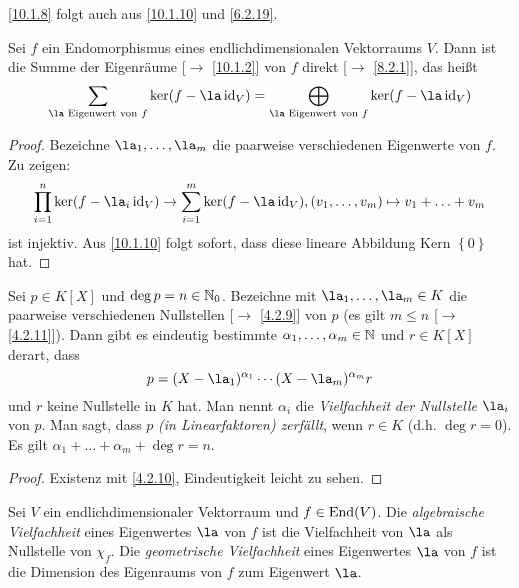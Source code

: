 \documentclass[../../main.tex]{subfiles}
\begin{document}
\begin{bem}\label{10.1.11}
\ref{10.1.8} folgt auch aus \ref{10.1.10} und \ref{6.2.19}.
\end{bem}

\begin{kor}\label{10.1.12}
Sei $f$ ein Endomorphismus eines endlichdimensionalen Vektorraums $V$. Dann ist die Summe der Eigenräume {\rm[$\to$ \ref{10.1.2}]} von $f$ direkt {\rm[$\to$ \ref{8.2.1}]}, das heißt
$$\sum_{\la\text{ Eigenwert von } f}\ker(f-\la\id_V) = \bigoplus_{\la\text{ Eigenwert von } f}\ker(f-\la\id_V)$$
\end{kor}
\begin{proof}
Bezeichne $\la_1,\ldots,\la_m$ die paarweise verschiedenen Eigenwerte von $f$. Zu zeigen:
$$\prod_{i = 1}^{n}\ker(f-\la_i\id_V)\to \sum_{i = 1}^{m}\ker(f-\la\id_V), (v_1,\ldots,v_m)\mapsto v_1+\ldots+v_m$$
ist injektiv. Aus \ref{10.1.10} folgt sofort, dass diese lineare Abbildung Kern $\left\{0\right\}$ hat.
\end{proof}

\begin{propdef}\label{10.1.13}
Sei $p\in K[X]$ und $\deg p = n\in \mathbb N_0$. Bezeichne mit $\la_1,\ldots,\la_m\in K$ die paarweise verschiedenen Nullstellen [$\to$ \ref{4.2.9}] von $p$ (es gilt $m\le n$ [$\to$ \ref{4.2.11}]). Dann gibt es eindeutig bestimmte $\alpha_1,\ldots,\alpha_m\in \mathbb N$ und $r\in K[X]$ derart, dass \[p = (X-\la_1)^{\alpha_1}\dotsm (X-\la_m)^{\alpha_m}r\]
und $r$ keine Nullstelle in $K$ hat. Man nennt $\alpha_i$ die \emph{Vielfachheit} \emph{der Nullstelle} $\la_i$ von $p$. Man sagt, dass $p$ \emph{(in Linearfaktoren) zerfällt}, wenn $r\in K$ (d.h. $\deg r = 0$). Es gilt $\alpha_1+\ldots+\alpha_m + \deg r = n$.
\end{propdef}
\begin{proof}
Existenz mit \ref{4.2.10}, Eindeutigkeit leicht zu sehen.
\end{proof}

\begin{df}\label{10.1.14}
Sei $V$ ein endlichdimensionaler Vektorraum und $f\in \operatorname{End}(V)$. Die \emph{algebraische Vielfachheit} eines Eigenwertes $\la$ von $f$ ist die Vielfachheit von $\la$ als Nullstelle von $\chi_f$.
Die \emph{geometrische Vielfachheit} eines Eigenwertes $\la$ von $f$ ist die Dimension des Eigenraums von $f$ zum Eigenwert $\la$.
\end{df}
\end{document}
